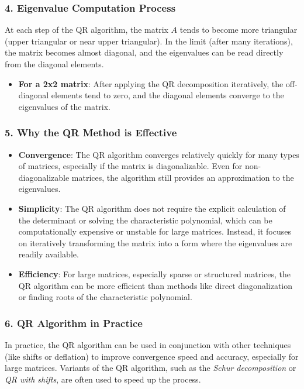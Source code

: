 \documentclass[article]{IEEEtran}
\numberwithin{equation}{enumi}
\numberwithin{figure}{enumi}
\begin{document}
\subsubsection{4. Eigenvalue Computation Process}
At each step of the QR algorithm, the matrix $A$ tends to become more triangular (upper triangular or near upper triangular). In the limit (after many iterations), the matrix becomes almost diagonal, and the eigenvalues can be read directly from the diagonal elements.

\begin{itemize}
    \item \textbf{For a 2x2 matrix}: After applying the QR decomposition iteratively, the off-diagonal elements tend to zero, and the diagonal elements converge to the eigenvalues of the matrix.
\end{itemize}

\subsubsection{5. Why the QR Method is Effective}
\begin{itemize}
    \item \textbf{Convergence}: The QR algorithm converges relatively quickly for many types of matrices, especially if the matrix is diagonalizable. Even for non-diagonalizable matrices, the algorithm still provides an approximation to the eigenvalues.
    \item \textbf{Simplicity}: The QR algorithm does not require the explicit calculation of the determinant or solving the characteristic polynomial, which can be computationally expensive or unstable for large matrices. Instead, it focuses on iteratively transforming the matrix into a form where the eigenvalues are readily available.
    \item \textbf{Efficiency}: For large matrices, especially sparse or structured matrices, the QR algorithm can be more efficient than methods like direct diagonalization or finding roots of the characteristic polynomial.
\end{itemize}

\subsubsection{6. QR Algorithm in Practice}
In practice, the QR algorithm can be used in conjunction with other techniques (like shifts or deflation) to improve convergence speed and accuracy, especially for large matrices. Variants of the QR algorithm, such as the \textit{Schur decomposition} or \textit{QR with shifts}, are often used to speed up the process.
\end{document}
